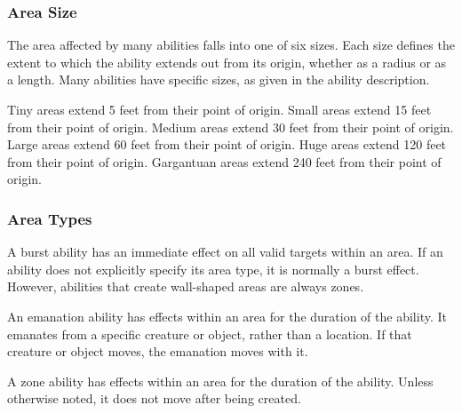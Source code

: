 
        \subsubsection{Area Size}

            The area affected by many abilities falls into one of six sizes.
            Each size defines the extent to which the ability extends out from its origin, whether as a radius or as a length.
            Many abilities have specific sizes, as given in the ability description.

             Tiny areas extend 5 feet from their point of origin.
             Small areas extend 15 feet from their point of origin.
             Medium areas extend 30 feet from their point of origin.
             Large areas extend 60 feet from their point of origin.
             Huge areas extend 120 feet from their point of origin.
             Gargantuan areas extend 240 feet from their point of origin.

        \subsubsection{Area Types}\label{Area Types}

             A burst ability has an immediate effect on all valid targets within an area.
            If an ability does not explicitly specify its area type, it is normally a burst effect.
            However, abilities that create wall-shaped areas are always zones.

             An emanation ability has effects within an area for the duration of the ability.
            It emanates from a specific creature or object, rather than a location.
            If that creature or object moves, the emanation moves with it.

             A zone ability has effects within an area for the duration of the ability.
            Unless otherwise noted, it does not move after being created.


